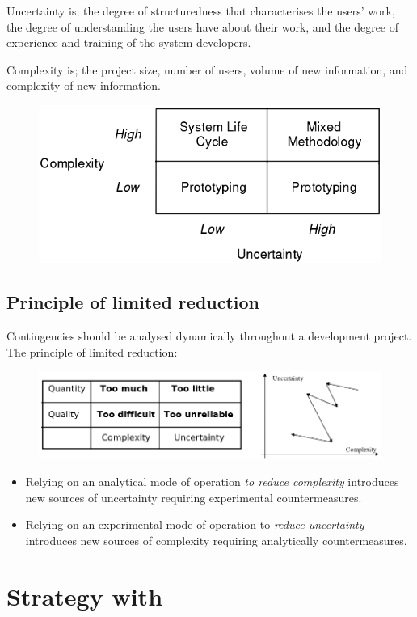 Uncertainty is; the degree of structuredness that characterises the users' work, the degree of understanding the users have about their work, and the degree of experience and training of the system developers.

Complexity is; the project size, number of users, volume of new information, and complexity of new information.

\begin{figure}[H]
    \centering
    \includegraphics[width=.5\textwidth]{figures/complexityuncertaintymodel.png}
\end{figure}

\subsection{Principle of limited reduction}
Contingencies should be analysed dynamically throughout a development project. The principle of limited reduction: 

\begin{figure}[H]
    \centering
    \includegraphics[width=.5\textwidth]{figures/limitedreduction.png}
\end{figure}

\begin{itemize}
    \item Relying on an analytical mode of operation \textit{to reduce complexity} introduces new sources of uncertainty requiring experimental countermeasures.
    \item Relying on an experimental mode of operation to \textit{reduce uncertainty} introduces new sources of complexity requiring analytically countermeasures.
\end{itemize}

\section{Strategy with \ad}

